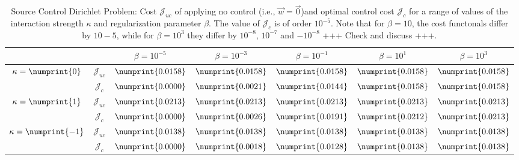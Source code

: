 \begin{table}
\centering
\begin{tabular}{ | c | c || c | c | c | c | c ||}
\hline
\multicolumn{2}{|c||}{}& $\beta = 10^{-5}$ & $\beta = 10^{-3}$ & $\beta = 10^{-1}$ & $\beta = 10^{1}$ & $\beta = 10^{3}$  \\
\hline
\hline
\multirow{2}{*}{$\kappa= \numprint{0}$}  & $\mathcal{J}_{uc}$ & $\numprint{0.0158}$ & $\numprint{0.0158}$ & $\numprint{0.0158}$ & $\numprint{0.0158}$ & $\numprint{0.0158}$\\
 & $\mathcal{J}_c$ & $\numprint{0.0000}$ & $\numprint{0.0021}$ & $\numprint{0.0144}$ & $\numprint{0.0158}$ & $\numprint{0.0158}$\\
\hline
\multirow{2}{*}{$\kappa= \numprint{1}$}  & $\mathcal{J}_{uc}$ & $\numprint{0.0213}$ & $\numprint{0.0213}$ & $\numprint{0.0213}$ & $\numprint{0.0213}$ & $\numprint{0.0213}$\\
 & $\mathcal{J}_c$ & $\numprint{0.0000}$ & $\numprint{0.0026}$ & $\numprint{0.0191}$ & $\numprint{0.0212}$ & $\numprint{0.0213}$\\
\hline
\multirow{2}{*}{$\kappa= \numprint{-1}$}  & $\mathcal{J}_{uc}$ & $\numprint{0.0138}$ & $\numprint{0.0138}$ & $\numprint{0.0138}$ & $\numprint{0.0138}$ & $\numprint{0.0138}$\\
 & $\mathcal{J}_c$ & $\numprint{0.0000}$ & $\numprint{0.0018}$ & $\numprint{0.0128}$ & $\numprint{0.0138}$ & $\numprint{0.0138}$\\
\hline
\end{tabular}
\caption{Source Control Dirichlet Problem: Cost $\mathcal{J}_{uc}$ of applying no control (i.e., $\vec{w} = \vec{0}$)and optimal control cost $\mathcal{J}_{c}$ for a range of values of the interaction strength $\kappa$ and regularization parameter $\beta$. The value of $\mathcal J_{c}$ is of order $10^{-5}$. Note that for $\beta = 10$, the cost functonals differ by $10-5$, while for $\beta = 10^3$ they differ by $10^{-8}$, $10^{-7}$ and $-10^{-8}$ +++ Check and discuss +++.}
\label{TabSCD}
\end{table}